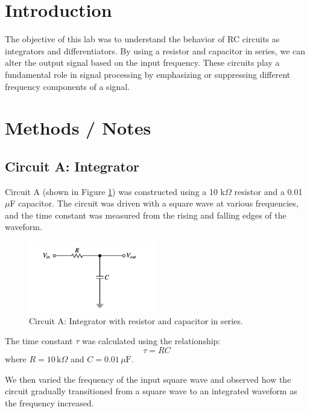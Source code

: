 \documentclass{article}
\begin{document}
\maketitle

\section{Introduction}
The objective of this lab was to understand the behavior of RC circuits as 
integrators and differentiators. By using a resistor and capacitor in series, 
we can alter the output signal based on the input frequency. These circuits 
play a fundamental role in signal processing by emphasizing or suppressing 
different frequency components of a signal.

\section{Methods / Notes}

\subsection{Circuit A: Integrator}
Circuit A (shown in Figure \ref{fig:circuitA}) was constructed using a 
10 k$\Omega$ resistor and a 0.01 $\mu$F capacitor. The circuit was driven 
with a square wave at various frequencies, and the time constant was measured 
from the rising and falling edges of the waveform.

\begin{figure}[H]
    \centering
    \includegraphics[width=0.5\textwidth]{./img/Lab2_curcuitA.png}  
    \caption{Circuit A: Integrator with resistor and capacitor in series.}
    \label{fig:circuitA}
\end{figure}

The time constant \( \tau \) was calculated using the relationship:
\[
\tau = RC
\]
where \( R = 10 \, \text{k}\Omega \) and \( C = 0.01 \, \mu\text{F} \).

We then varied the frequency of the input square wave and observed how the circuit 
gradually transitioned from a square wave to an integrated waveform as the frequency increased.
\end{document}

